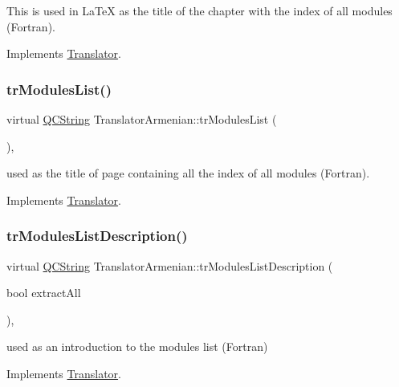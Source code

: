 This is used in La\+TeX as the title of the chapter with the index of all modules (Fortran). 

Implements \mbox{\hyperlink{class_translator}{Translator}}.

\mbox{\label{class_translator_armenian_a327ab48fc47d219fcb71e7d26009d51f}} 
\subsubsection{\texorpdfstring{trModulesList()}{trModulesList()}}
{\footnotesize\ttfamily virtual \mbox{\hyperlink{class_q_c_string}{Q\+C\+String}} Translator\+Armenian\+::tr\+Modules\+List (\begin{DoxyParamCaption}{ }\end{DoxyParamCaption})\hspace{0.3cm}{\ttfamily [inline]}, {\ttfamily [virtual]}}

used as the title of page containing all the index of all modules (Fortran). 

Implements \mbox{\hyperlink{class_translator}{Translator}}.

\mbox{\label{class_translator_armenian_a57123210c0cee1ee1c8feef381413dce}} 
\subsubsection{\texorpdfstring{trModulesListDescription()}{trModulesListDescription()}}
{\footnotesize\ttfamily virtual \mbox{\hyperlink{class_q_c_string}{Q\+C\+String}} Translator\+Armenian\+::tr\+Modules\+List\+Description (\begin{DoxyParamCaption}\item[{bool}]{extract\+All }\end{DoxyParamCaption})\hspace{0.3cm}{\ttfamily [inline]}, {\ttfamily [virtual]}}

used as an introduction to the modules list (Fortran) 

Implements \mbox{\hyperlink{class_translator}{Translator}}.

